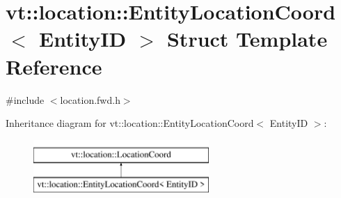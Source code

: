 \hypertarget{structvt_1_1location_1_1_entity_location_coord}{}\section{vt\+:\+:location\+:\+:Entity\+Location\+Coord$<$ Entity\+ID $>$ Struct Template Reference}
\label{structvt_1_1location_1_1_entity_location_coord}


{\ttfamily \#include $<$location.\+fwd.\+h$>$}

Inheritance diagram for vt\+:\+:location\+:\+:Entity\+Location\+Coord$<$ Entity\+ID $>$\+:\begin{figure}[H]
\begin{center}
\leavevmode
\includegraphics[height=2.000000cm]{structvt_1_1location_1_1_entity_location_coord}
\end{center}
\end{figure}
